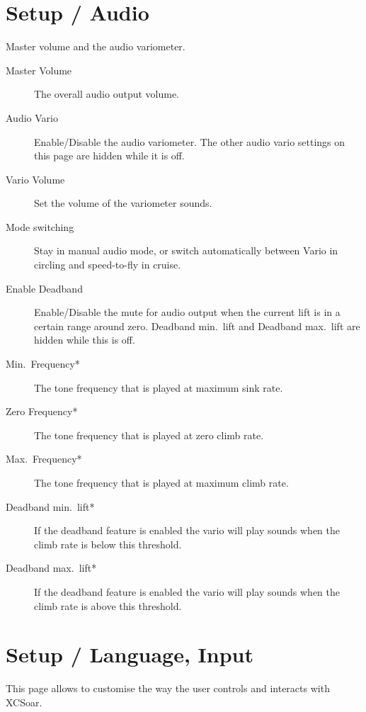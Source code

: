 \section{Setup / Audio}\label{sec:audiovario-gauge}

Master volume and the audio variometer. \label{conf:audiovariogauge}

\begin{description}
\item[Master Volume]  The overall audio output volume.
\item[Audio Vario]  Enable/Disable the audio variometer. The other
  audio vario settings on this page are hidden while it is off.
\item[Vario Volume]  Set the volume of the variometer sounds.
\item[Mode switching]  Stay in manual audio mode, or switch automatically
  between Vario in circling and speed-to-fly in cruise.
\item[Enable Deadband]  Enable/Disable the mute for audio output when the current lift is in a certain range around zero. Deadband min.\ lift and Deadband max.\ lift are hidden while this is off.
\item[Min.\ Frequency*]  The tone frequency that is played at maximum sink rate.
\item[Zero Frequency*]  The tone frequency that is played at zero climb rate.
\item[Max.\ Frequency*]  The tone frequency that is played at maximum climb rate.
\item[Deadband min.\ lift*]  If the deadband feature is enabled the vario will play sounds when the climb rate is below this threshold.
\item[Deadband max.\ lift*]  If the deadband feature is enabled the vario will play sounds when the climb rate is above this threshold.
\end{description}


\section{Setup / Language, Input}\label{sec:interface}

This page allows to customise the way the user controls and interacts with
XCSoar.

